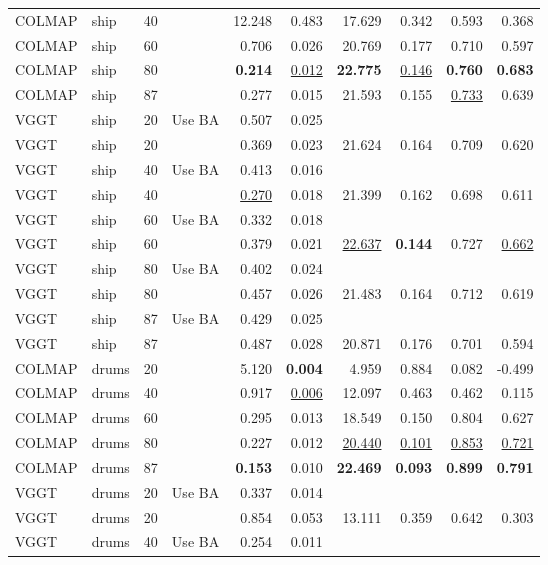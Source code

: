 \begin{table}[H]
\begin{tabular}{llrlrrrrrr}
COLMAP & ship & 40 &  & 12.248 & 0.483 & 17.629 & 0.342 & 0.593 & 0.368 \\
COLMAP & ship & 60 &  & 0.706 & 0.026 & 20.769 & 0.177 & 0.710 & 0.597 \\
COLMAP & ship & 80 &  & \textbf{0.214} & \underline{0.012} & \textbf{22.775} & \underline{0.146} & \textbf{0.760} & \textbf{0.683} \\
COLMAP & ship & 87 &  & 0.277 & 0.015 & 21.593 & 0.155 & \underline{0.733} & 0.639 \\
VGGT & ship & 20 & Use BA & 0.507 & 0.025 &  &  &  &  \\
VGGT & ship & 20 &  & 0.369 & 0.023 & 21.624 & 0.164 & 0.709 & 0.620 \\
VGGT & ship & 40 & Use BA & 0.413 & 0.016 &  &  &  &  \\
VGGT & ship & 40 &  & \underline{0.270} & 0.018 & 21.399 & 0.162 & 0.698 & 0.611 \\
VGGT & ship & 60 & Use BA & 0.332 & 0.018 &  &  &  &  \\
VGGT & ship & 60 &  & 0.379 & 0.021 & \underline{22.637} & \textbf{0.144} & 0.727 & \underline{0.662} \\
VGGT & ship & 80 & Use BA & 0.402 & 0.024 &  &  &  &  \\
VGGT & ship & 80 &  & 0.457 & 0.026 & 21.483 & 0.164 & 0.712 & 0.619 \\
VGGT & ship & 87 & Use BA & 0.429 & 0.025 &  &  &  &  \\
VGGT & ship & 87 &  & 0.487 & 0.028 & 20.871 & 0.176 & 0.701 & 0.594 \\
\midrule
COLMAP & drums & 20 &  & 5.120 & \textbf{0.004} & 4.959 & 0.884 & 0.082 & -0.499 \\
COLMAP & drums & 40 &  & 0.917 & \underline{0.006} & 12.097 & 0.463 & 0.462 & 0.115 \\
COLMAP & drums & 60 &  & 0.295 & 0.013 & 18.549 & 0.150 & 0.804 & 0.627 \\
COLMAP & drums & 80 &  & 0.227 & 0.012 & \underline{20.440} & \underline{0.101} & \underline{0.853} & \underline{0.721} \\
COLMAP & drums & 87 &  & \textbf{0.153} & 0.010 & \textbf{22.469} & \textbf{0.093} & \textbf{0.899} & \textbf{0.791} \\
VGGT & drums & 20 & Use BA & 0.337 & 0.014 &  &  &  &  \\
VGGT & drums & 20 &  & 0.854 & 0.053 & 13.111 & 0.359 & 0.642 & 0.303 \\
VGGT & drums & 40 & Use BA & 0.254 & 0.011 &  &  &  &  \\

\end{tabular}
\end{table}
